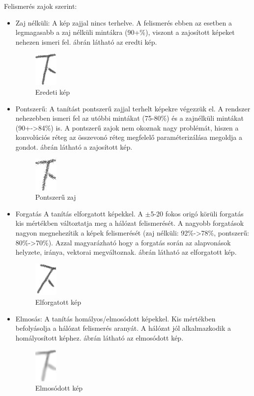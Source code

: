Felismerés zajok szerint:
\begin{itemize}
\item Zaj nélküli: A kép zajjal nincs terhelve. A felismerés ebben az esetben a legmagasabb a zaj nélküli mintákra (90+\%), viszont a zajosított képeket nehezen ismeri fel. ábrán látható az eredti kép.

\begin{figure}[h]
	\centering
	\includegraphics[scale=1.0]{images/original}
	\caption{Eredeti kép}
	\label{fig:original}
\end{figure}

\item Pontszerű: A tanítást pontszerű zajjal terhelt képekre végezzük el. A rendszer nehezebben ismeri fel az utóbbi mintákat (75-80\%) és a zajnélküli mintákat (90+->84\%) is. A pontszerű zajok nem okoznak nagy problémát, hiszen a konvolúciós réteg az összevonó réteg megfelelő paraméterizálása megoldja a gondot. ábrán látható a zajosított kép.

\begin{figure}[h]
	\centering
	\includegraphics[scale=1.0]{images/noise}
	\caption{Pontszerű zaj}
	\label{fig:noise}
\end{figure}

\item Forgatás A tanítás elforgatott képekkel. A $\pm$5-20 fokos origó körüli forgatás kis mértékben változtatja meg a hálózat felismerését. A nagyobb forgatások nagyon megnehezítik a képek felismerését (zaj nélküli: 92\%->78\%, pontszerű: 80\%->70\%). Azzal magyarázható hogy a forgatás során az alapvonások helyzete, iránya, vektorai megváltoznak.  ábrán látható az elforgatott kép.

\begin{figure}[h]
	\centering
	\includegraphics[scale=1.0]{images/rotate}
	\caption{Elforgatott kép}
	\label{fig:rotated}
\end{figure}
\newpage
\item Elmosás: A tanítás homályos/elmosódott képekkel. Kis mértékben befolyásolja a hálózat felismerés aranyát. A hálózat jól alkalmazkodik a homályosított képhez. ábrán látható az elmosódott kép.

\begin{figure}[h]
	\centering
	\includegraphics[scale=1.0]{images/blur}
	\caption{Elmosódott kép}
	\label{fig:blur}
\end{figure}

\end{itemize}